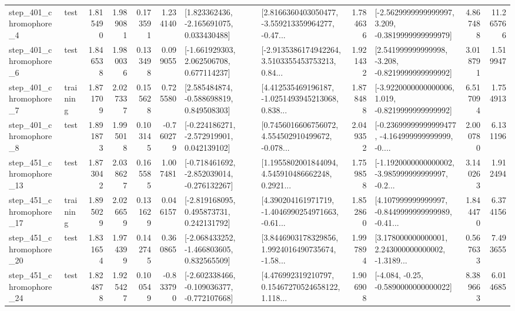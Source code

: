 \begin{tabular}{llrrrrllrlrr}
   step\_401\_chromophore\_4 &      test &      1.815490 &    1.989081 &      0.173591 &  1.234140 &    [1.823362436, -2.165691075, 0.033430488] &  [2.8166360403050477, -3.559213359964277, -0.47... &       1.784636 &  [-2.5629999999999997, 3.209, -0.3819999999999979] &            4.867488 &         11.265766 \\
   step\_401\_chromophore\_6 &      test &      1.846538 &    1.980036 &      0.133498 &  0.099055 &    [-1.661929303, 2.062506708, 0.677114237] &  [-2.9135386174942264, 3.5103355453753213, 0.84... &       1.921432 &   [2.541999999999998, -3.208, -0.8219999999999992] &            3.018791 &          1.519947 \\
   step\_401\_chromophore\_7 &  training &      1.871709 &    2.027337 &      0.155628 &  0.725580 &    [2.585484874, -0.588698819, 0.849508303] &  [4.412535469196187, -1.0251493945213068, 0.838... &       1.878488 &  [-3.9220000000000006, 1.019, -0.8219999999999992] &            6.517094 &          1.754913 \\
   step\_401\_chromophore\_8 &      test &      1.891873 &    1.995018 &      0.103145 & -0.760279 &   [-0.224186271, -2.572919901, 0.042139102] &  [0.7456016606756072, 4.554502910499672, -0.078... &       2.049352 &  [-0.23699999999999477, -4.164999999999999, -0.... &            2.000780 &          6.131196 \\
  step\_451\_chromophore\_13 &      test &      1.873042 &    2.038627 &      0.165585 &  1.007481 &  [-0.718461692, -2.852039014, -0.276132267] &  [1.1955802001844094, 4.545910486662248, 0.2921... &       1.759858 &  [-1.1920000000000002, -3.985999999999997, -0.2... &            3.140263 &          1.912494 \\
  step\_451\_chromophore\_17 &  training &      1.895029 &    2.026659 &      0.131629 &  0.046157 &    [-2.819168095, 0.495873731, 0.242131792] &  [4.390204161971719, -1.4046990254971663, -0.61... &       1.852860 &  [4.107999999999997, -0.8449999999999989, -0.41... &            1.844470 &          6.374156 \\
  step\_451\_chromophore\_20 &      test &      1.831654 &    1.974399 &      0.142745 &  0.360865 &   [-2.068433252, -1.466803605, 0.832565509] &  [3.8446903178329856, 1.9924016490735674, -1.58... &       1.997894 &  [3.178000000000001, 2.243000000000002, -1.3189... &            0.567633 &          7.493655 \\
  step\_451\_chromophore\_24 &      test &      1.824878 &    1.925427 &      0.100549 & -0.833790 &  [-2.602338466, -0.109036377, -0.772107668] &  [4.476992319210797, 0.15467270524658122, 1.118... &       1.906908 &               [-4.084, -0.25, -0.5890000000000022] &            8.389663 &          6.014685 \\

\end{tabular}
